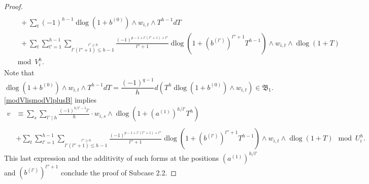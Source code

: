 \documentclass[11pt]{amsart}
\newcommand{\eq}[2]{\begin{equation}\label{#1}#2 \end{equation}}
\newcommand{\sB}{\mathfrak{B}}
\newcommand{\dlog}{\operatorname{dlog}}
\theoremstyle{plain}
\theoremstyle{definition}
\numberwithin{equation}{prop}
\begin{document}
\begin{proof}
\begin{align*}
\\&\quad +
  \sum_t
(-1)^{h-1}\dlog(1+b^{(0)})
\wedge w_{i,t}
\wedge T^{h-1}dT
\nonumber
\\& \quad +
 \sum_t\sum_{l'=1}^{h-1} \sum_{
\stackrel{l''\ge 0}{ l'(l''+1)\le h-1}}
\frac{(-1)^{p-1+l'(l''+1)+l''}}{l''+1}
\dlog(1+(b^{(l')})^{l''+1}T^{h-1})
\wedge w_{i,t}
\wedge \dlog(1+T)
\\
&
\mod V_i^h.
\end{align*} 
Note that
\eq{}{
\dlog(1+b^{(0)})
\wedge w_{i,t}
\wedge T^{h-1}dT
=\frac{(-1)^{q-1}}{h}
d(T^h\dlog(1+b^{(0)})
\wedge w_{i,t})
\in \sB_1.
}
\eqref{modVlismodVlplusB} implies
\begin{align*} 
v&\equiv
 \sum_s
\sum_{l'\mid h}
\frac{(-1)^{h/l'-1} l'}{h}\cdot  w_{i,s}
\wedge \dlog(1+ (a^{(1)})^{h/l'}T^h)
\\
\\&+
 \sum_t\sum_{l'=1}^{h-1} \sum_{
\stackrel{l''\ge 0}{ l'(l''+1)\le h-1}}
\frac{(-1)^{p-1+l'(l''+1)+l''}}{l''+1}
\dlog(1+(b^{(l')})^{l''+1}T^{h-1})
\wedge w_{i,t}
\wedge \dlog(1+T)
\mod U_i^h.
\end{align*}
This last expression  and the additivity of such forms at  the positions
$(a^{(1)})^{h/l'}$ and $(b^{(l')})^{l''+1}$ conclude the proof of Subcase 2.2.
\end{proof}
\end{document}
